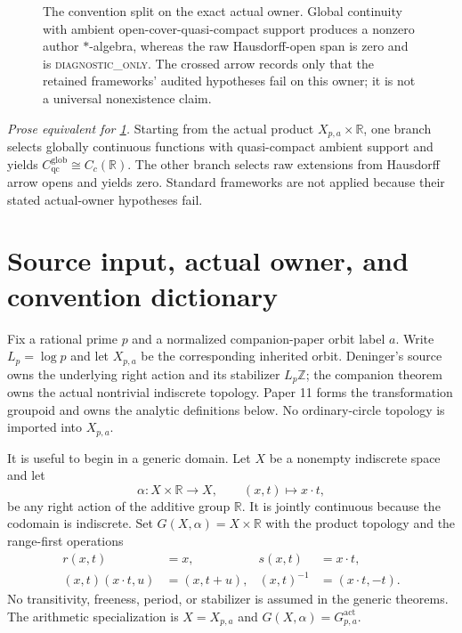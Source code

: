 \documentclass[11pt]{article}
\theoremstyle{definition}
\newcommand{\R}{\mathbb R}
\newcommand{\Z}{\mathbb Z}
\newcommand{\Gact}{G_{p,a}^{\mathrm{act}}}
\newcommand{\Xpa}{X_{p,a}}
\newcommand{\Cglob}{C_{\mathrm{qc}}^{\mathrm{glob}}}
\newcommand{\Diag}{\textsc{diagnostic\_only}}
\begin{document}
\begin{figure}[htbp]
\centering
\resizebox{0.99\textwidth}{!}{}
\caption{The convention split on the exact actual owner.  Global continuity
with ambient open-cover-quasi-compact support produces a nonzero author
$*$-algebra, whereas the raw Hausdorff-open span is zero and is
\Diag.  The crossed arrow records only that the retained frameworks' audited
hypotheses fail on this owner; it is not a universal nonexistence claim.}
\label{fig:convention-split}
\end{figure}

\noindent\textit{Prose equivalent for \cref{fig:convention-split}.}
Starting from the actual product $\Xpa\times\R$, one branch selects globally
continuous functions with quasi-compact ambient support and yields
$\Cglob\cong C_c(\R)$.  The other branch selects raw extensions from
Hausdorff arrow opens and yields zero.  Standard frameworks are not applied
because their stated actual-owner hypotheses fail.

\section{Source input, actual owner, and convention dictionary}
\label{sec:owners}

Fix a rational prime $p$ and a normalized companion-paper orbit label $a$.
Write $L_p=\log p$ and let $\Xpa$ be the corresponding inherited orbit.
Deninger's source owns the underlying right action and its stabilizer
$L_p\Z$; the companion theorem owns the actual nontrivial indiscrete
topology.  Paper 11 forms the transformation groupoid and owns the analytic
definitions below.  No ordinary-circle topology is imported into $\Xpa$.

It is useful to begin in a generic domain.  Let $X$ be a nonempty indiscrete
space and let
\[
  \alpha:X\times\R\longrightarrow X,\qquad (x,t)\longmapsto x\cdot t,
\]
be any right action of the additive group $\R$.  It is jointly continuous
because the codomain is indiscrete.  Set $G(X,\alpha)=X\times\R$ with the
product topology and the range-first operations
\begin{align}
 r(x,t)&=x, & s(x,t)&=x\cdot t,\label{eq:range-source}\\
 (x,t)(x\cdot t,u)&=(x,t+u), & (x,t)^{-1}&=(x\cdot t,-t).
 \label{eq:groupoid-operations}
\end{align}
No transitivity, freeness, period, or stabilizer is assumed in the generic
theorems.  The arithmetic specialization is $X=\Xpa$ and
$G(X,\alpha)=\Gact$.
\end{document}
